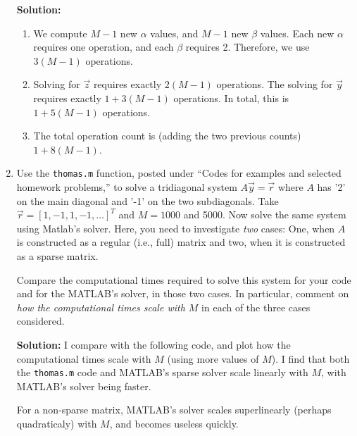 \documentclass[11pt]{article}
\begin{document}
\begin{enumerate}
\bigskip
\textbf{Solution:} 
\begin{enumerate}
\item We compute $M-1$ new $\alpha$ values, and $M-1$ new $\beta$ values.
Each new $\alpha$ requires one operation, and each $\beta$ requires 2.
Therefore, we use $3(M-1)$ operations.
\item Solving for $\vec{z}$ requires exactly $2(M-1)$ operations.
The solving for $\vec{y}$ requires exactly $1+3(M-1)$ operations.
In total, this is $1+5(M-1)$ operations.
\item The total operation count is (adding the two previous counts) $1+8(M-1)$.
\end{enumerate}

\clearpage
\pagebreak
\item Use the \verb|thomas.m| function, posted under ``Codes for examples and selected homework problems,'' to solve a tridiagonal system $A\vec{y} = \vec{r}$ where $A$ has '2' on the main diagonal and '-1' on the two subdiagonals.
Take $\vec{r} = [1,-1,1,-1,\ldots]^T$ and $M = 1000$ and 5000.
Now solve the same system using Matlab's solver.
Here, you need to investigate {\em two} cases: One, when $A$ is constructed as a regular (i.e., full) matrix and two, when it is constructed as a sparse matrix.

Compare the computational times required to solve this system for your code and for the MATLAB's solver, in those two cases.
In particular, comment on {\em how the computational times scale with $M$} in each of the three cases considered.

\bigskip
\textbf{Solution:} I compare with the following code, and plot how the computational times scale with $M$ (using more values of $M$).
I find that both the \verb|thomas.m| code and MATLAB's sparse solver scale linearly with $M$, with MATLAB's solver being faster.

For a non-sparse matrix, MATLAB's solver scales superlinearly (perhaps quadraticaly) with $M$, and becomes useless quickly.




\end{enumerate}
\end{document}
